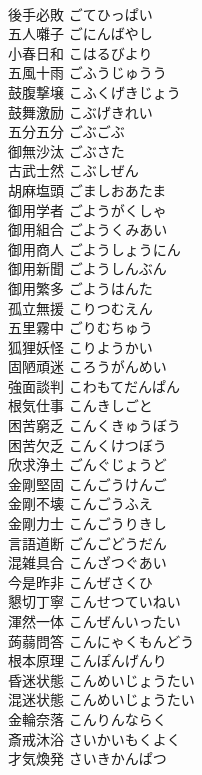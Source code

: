 \documentclass[8pt]{extreport}
\begin{document}
\begin{CJK}{UTF8}{min}
\\	後手必敗	ごてひっぱい	
\\	五人囃子	ごにんばやし	
\\	小春日和	こはるびより	
\\	五風十雨	ごふうじゅうう	
\\	鼓腹撃壌	こふくげきじょう	
\\	鼓舞激励	こぶげきれい	
\\	五分五分	ごぶごぶ	
\\	御無沙汰	ごぶさた	
\\	古武士然	こぶしぜん	
\\	胡麻塩頭	ごましおあたま	
\\	御用学者	ごようがくしゃ	
\\	御用組合	ごようくみあい	
\\	御用商人	ごようしょうにん	
\\	御用新聞	ごようしんぶん	
\\	御用繁多	ごようはんた	
\\	孤立無援	こりつむえん	
\\	五里霧中	ごりむちゅう	
\\	狐狸妖怪	こりようかい	
\\	固陋頑迷	ころうがんめい	
\\	強面談判	こわもてだんぱん	
\\	根気仕事	こんきしごと	
\\	困苦窮乏	こんくきゅうぼう	
\\	困苦欠乏	こんくけつぼう	
\\	欣求浄土	ごんぐじょうど	
\\	金剛堅固	こんごうけんご	
\\	金剛不壊	こんごうふえ	
\\	金剛力士	こんごうりきし	
\\	言語道断	ごんごどうだん	
\\	混雑具合	こんざつぐあい	
\\	今是昨非	こんぜさくひ	
\\	懇切丁寧	こんせつていねい	
\\	渾然一体	こんぜんいったい	
\\	蒟蒻問答	こんにゃくもんどう	
\\	根本原理	こんぽんげんり	
\\	昏迷状態	こんめいじょうたい	
\\	混迷状態	こんめいじょうたい	
\\	金輪奈落	こんりんならく	
\\	斎戒沐浴	さいかいもくよく	
\\	才気煥発	さいきかんぱつ	

\end{CJK}
\end{document}
